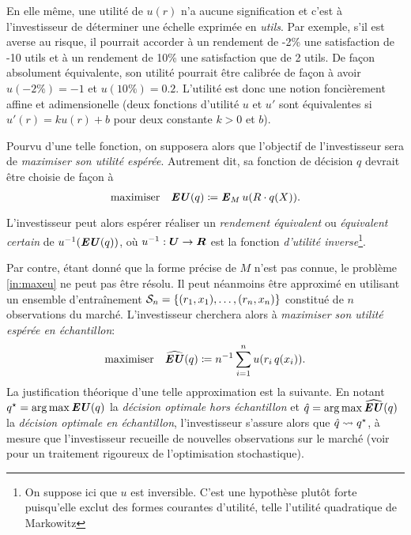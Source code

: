En elle même, une utilité de $u(r)$ n'a aucune signification et c'est à l'investisseur de
déterminer une échelle exprimée en \textit{utils}. Par exemple, s'il est averse au risque,
il pourrait accorder à un rendement de -2\% une satisfaction de -10 utils et à un
rendement de 10\% une satisfaction que de 2 utils. De façon absolument équivalente, son
utilité pourrait être calibrée de façon à avoir $u(-2\%) = -1$ et $u(10\%) =
0.2$. L'utilité est donc une notion foncièrement affine et adimensionelle (deux fonctions
d'utilité $u$ et $u'$ sont équivalentes si $u'(r) = ku(r) + b$ pour deux constante $k>0$
et $b$).

Pourvu d'une telle fonction, on supposera alors que l'objectif de l'investisseur sera de
\textit{maximiser son utilité espérée}. Autrement dit, sa fonction de décision $q$ devrait
être choisie de façon à
\begin{equation}
  \label{in:maxeu}
  \maximizeEquation{\EU(q) \coloneq \E_M u(R\cdot q(X)).}
\end{equation}
L'investisseur peut alors espérer réaliser un \textit{rendement équivalent} ou
\textit{équivalent certain} de $u^{-1}(\EU(q))$, où $u^{-1}:\Ut \to \R$ est la fonction
\textit{d'utilité inverse}\footnote{On suppose ici que $u$ est inversible. C'est une
  hypothèse plutôt forte puisqu'elle exclut des formes courantes d'utilité, telle
  l'utilité quadratique de Markowitz}.

Par contre, étant donné que la forme précise de $M$ n'est pas connue, le problème
\eqref{in:maxeu} ne peut pas être résolu. Il peut néanmoins être approximé en utilisant un
ensemble d'entraînement $\S_n = \{(r_1,x_1),\ldots,(r_n,x_n)\}$ constitué de $n$
observations du marché. L'investisseur cherchera alors à \textit{maximiser son utilité
  espérée en échantillon}:
\begin{equation}
  \maximizeEquation{\hEU(q) \coloneqq n^{-1} \sumi u(r_i\,q(x_i)).}
\end{equation}
La justification théorique d'une telle approximation est la suivante. En notant
$q^\star = \argmax\EU(q)$ la \textit{décision optimale hors échantillon} et
$\qh = \argmax\hEU(q)$ la \textit{décision optimale en échantillon}, l'investisseur
s'assure alors que $\qh \leadsto q^\star$, à mesure que l'investisseur recueille de nouvelles
observations sur le marché (voir \cite{shapiro2009lectures} pour un traitement rigoureux
de l'optimisation stochastique).


